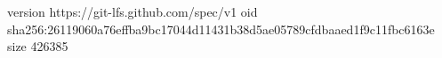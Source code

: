 version https://git-lfs.github.com/spec/v1
oid sha256:26119060a76effba9bc17044d11431b38d5ae05789cfdbaaed1f9c11fbc6163e
size 426385
